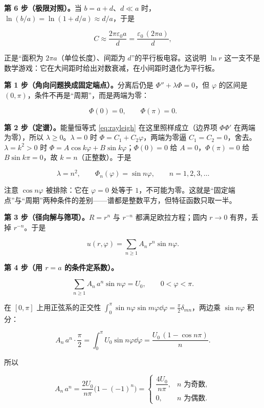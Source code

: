 \textbf{第 6 步（极限对照）。}当 $b=a+d$、$d\ll a$ 时，$\ln(b/a)=\ln(1+d/a)\approx d/a$，于是

\[
C\approx\frac{2\pi\varepsilon_0 a}{d}=\frac{\varepsilon_0\,(2\pi a)}{d},
\]

正是“面积为 $2\pi a$（单位长度）、间距为 $d$”的平行板电容。这说明 $\ln r$ 这一支不是数学游戏：它在大间距时给出对数衰减，在小间距时退化为平行板。


\textbf{第 1 步（角向问题换成固定端点）。}分离后仍是 $\Phi''+\lambda\Phi=0$，但 $\varphi$ 的区间是 $(0,\pi)$，条件不再是“周期”，而是两端为零：

\[
\Phi(0)=0,\qquad \Phi(\pi)=0 .
\]

\textbf{第 2 步（定谱）。}能量恒等式 \eqref{eq:rayleigh} 在这里照样成立（边界项 $\Phi\Phi'$ 在两端为零），所以 $\lambda\ge0$。$\lambda=0$ 时 $\Phi=C_1+C_2\varphi$，两端为零逼 $C_1=C_2=0$，舍去。$\lambda=k^2>0$ 时 $\Phi=A\cos k\varphi+B\sin k\varphi$；$\Phi(0)=0$ 给 $A=0$，$\Phi(\pi)=0$ 给 $B\sin k\pi=0$，故 $k=n$（正整数）。于是

\[
\lambda=n^2,\qquad \Phi_n(\varphi)=\sin n\varphi,\qquad n=1,2,3,\dots
\]

注意 $\cos n\varphi$ 被排除：它在 $\varphi=0$ 处等于 $1$，不可能为零。这就是“固定端点”与“周期”两种条件的差别——谱都是整数平方，但特征函数只取一半。

\textbf{第 3 步（径向解与筛项）。}$R=r^n$ 与 $r^{-n}$ 都满足欧拉方程；圆内 $r\to0$ 有界，丢掉 $r^{-n}$。于是

\[
u(r,\varphi)=\sum_{n\ge1}A_n\,r^n\sin n\varphi .
\]

\textbf{第 4 步（用 $r=a$ 的条件定系数）。}

\[
\sum_{n\ge1}A_n\,a^n\sin n\varphi=U_0,\qquad 0<\varphi<\pi .
\]

在 $[0,\pi]$ 上用正弦系的正交性 $\displaystyle\int_0^\pi\sin n\varphi\sin m\varphi\dd\varphi=\frac\pi2\delta_{mn}$，两边乘 $\sin n\varphi$ 积分：

\[
A_n\,a^n\cdot\frac\pi2=\int_0^\pi U_0\sin n\varphi\dd\varphi=\frac{U_0\,(1-\cos n\pi)}{n}.
\]

所以

\[
A_n\,a^n=\frac{2U_0}{n\pi}\big(1-(-1)^n\big)=
\begin{cases}
\dfrac{4U_0}{n\pi}, & n\text{ 为奇数},\\[6pt]
0, & n\text{ 为偶数}.
\end{cases}
\]

